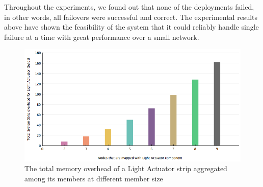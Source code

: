 Throughout the experiments, we found out that none of the deployments failed, in
other words, all failovers were successful and correct. The experimental results
above have shown the feasibility of the system that it could reliably handle
single failure at a time with great performance over a small network.





\begin{figure}[h!]
\centering
    \includegraphics[width=\linewidth]{figures/results-system-overhead-vs-network-size}
\caption{The total memory overhead of a Light Actuator strip aggregated among its members at different member size}
\label{fig:results-system-overhead-vs-network-size}
\end{figure}


